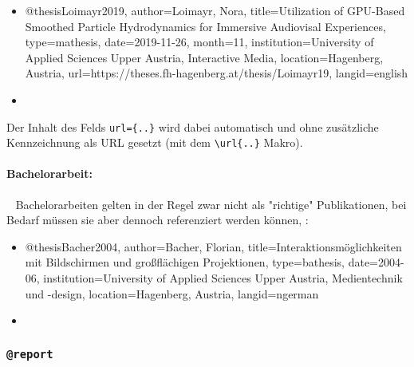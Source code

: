 %
\begin{itemize}
\item[]
\begin{GenericCode}[numbers=none]
@thesis{Loimayr2019,
  author={Loimayr, Nora},
  title={Utilization of GPU-Based Smoothed Particle Hydrodynamics for Immersive Audiovisal Experiences},
  type={mathesis},
  date={2019-11-26},
  month={11},
  institution={University of Applied Sciences Upper Austria, Interactive Media},
  location={Hagenberg, Austria},
  url={https://theses.fh-hagenberg.at/thesis/Loimayr19},
  langid={english}
}
\end{GenericCode}
\item[\cite{Loimayr2019}] 
\end{itemize}
%
Der Inhalt des Felds \verb!url={..}! wird dabei automatisch und ohne
zusätzliche Kennzeichnung als URL gesetzt (mit dem \verb!\url{..}! Makro).


\paragraph{Bachelorarbeit:} ~ \newline
Bachelorarbeiten gelten in der Regel zwar nicht als "richtige" Publikationen,
bei Bedarf müssen sie aber dennoch referenziert werden können, \zB:
%
\begin{itemize}
\item[]
\begin{GenericCode}[numbers=none]
@thesis{Bacher2004,
  author={Bacher, Florian},
  title={Interaktionsmöglichkeiten mit Bildschirmen und großflächigen Projektionen},
  type={bathesis},
  date={2004-06},
  institution={University of Applied Sciences Upper Austria, Medientechnik und {-design}},
  location={Hagenberg, Austria},
  langid={ngerman}
}
\end{GenericCode}
\item[\cite{Bacher2004}] 
\end{itemize}


\subsubsection{\texttt{\bfseries @report}}
\label{sec:@report}

